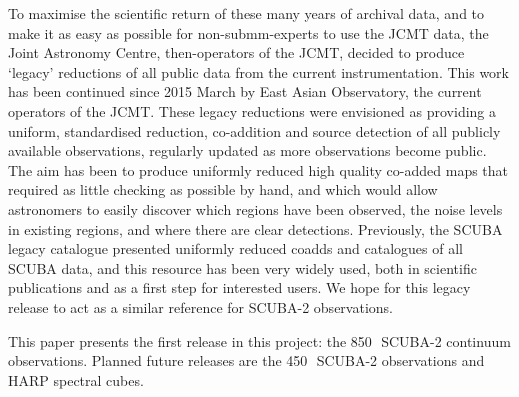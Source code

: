 \documentclass[twocolumn]{aastex6}
\newcommand{\um}{\micron}
\begin{document}
To maximise the scientific return of these many years of archival
data, and to make it as easy as possible for non-submm-experts to use
the JCMT data, the Joint Astronomy Centre, then-operators of the JCMT,
decided to produce `legacy' reductions of all public data from the
current instrumentation. This work has been continued since 2015 March
by East Asian Observatory, the current operators of the JCMT. These
legacy reductions were envisioned as providing a uniform, standardised
reduction, co-addition and source detection of all publicly available
observations, regularly updated as more observations become
public. The aim has been to produce uniformly reduced high quality
co-added maps that required as little checking as possible by hand,
and which would allow astronomers to easily discover which regions
have been observed, the noise levels in existing regions, and where
there are clear detections. Previously, the SCUBA legacy catalogue
\citep{DiFrancesco2008} presented uniformly reduced coadds and
catalogues of all SCUBA data, and this resource has been very widely
used, both in scientific publications and as a first step for
interested users. We hope for this legacy release to act as a similar
reference for SCUBA-2 observations.

This paper presents the first release in this project: the 850\,\um\
SCUBA-2 continuum observations. Planned future releases are the
450\,\um\ SCUBA-2 observations and HARP spectral cubes.


\end{document}
